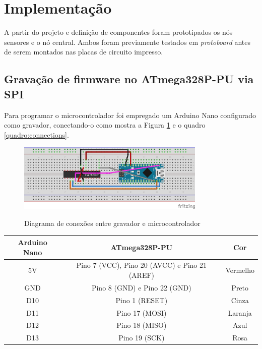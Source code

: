\documentclass[oneside,openright,12pt]{ufsm_2015} %
\begin{document}
    \section{Implementação}
    A partir do projeto e definição de componentes foram prototipados os nós sensores e o nó central. Ambos foram previamente testados em \textit{protoboard} antes de serem montados nas placas de circuito impresso. 
    
    \subsection{Gravação de firmware no ATmega328P-PU via SPI}
    Para programar o microcontrolador foi empregado um Arduino Nano configurado como gravador, conectando-o como mostra a Figura \ref{fig:gravador-sensor-node} e o quadro \ref{quadro:connections}. 
    
    \begin{figure}[ht]
 	    \caption{\label{exepretex} Diagrama de conexões entre gravador e microcontrolador}
        \centering
        \includegraphics[width=0.8\textwidth]{figuras/firmware-programmer_bb.png}
        \vspace{\baselineskip} %
        \label{fig:gravador-sensor-node}
    \end{figure}
    
    \begin{quadro}
   	    \caption{Conexões para gravação de \textit{firmware}}
	    \centering
	    \begin{tabular}{| c | c | c | }
	    \hline
	    Arduino Nano & ATmega328P-PU & Cor\\
	    \hline
	    5V & Pino 7 (VCC), Pino 20 (AVCC) e Pino 21 (AREF) & Vermelho\\
	    \hline
	    GND & Pino 8 (GND) e Pino 22 (GND) & Preto\\
	    \hline
	    D10 & Pino 1 (RESET) & Cinza\\
	    \hline
	    D11 & Pino 17 (MOSI) & Laranja\\
	    \hline
	    D12 & Pino 18 (MISO) & Azul\\
	    \hline
	    D13 & Pino 19 (SCK) & Rosa\\
	    \hline
	    \end{tabular}
	    \vspace{\baselineskip} %
	    \label{quadro:connections}
\end{quadro}
    
\end{document}
